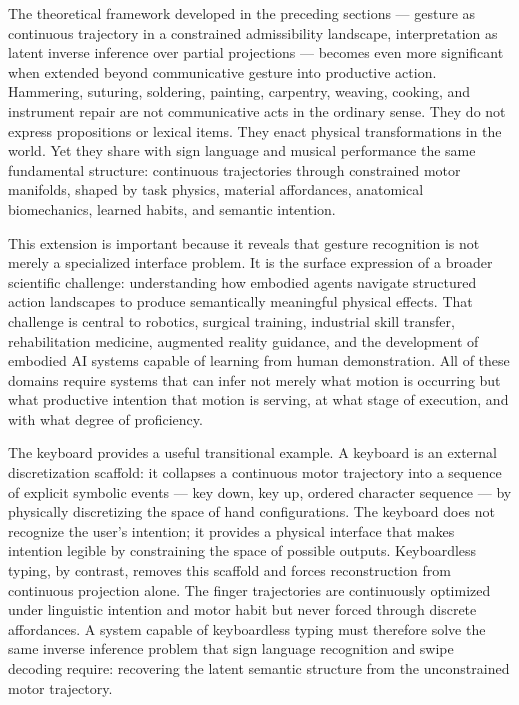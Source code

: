 \documentclass[11pt, a4paper]{article}
\theoremstyle{definition}
\begin{document}
The theoretical framework developed in the preceding sections --- gesture as continuous trajectory in a constrained admissibility landscape, interpretation as latent inverse inference over partial projections --- becomes even more significant when extended beyond communicative gesture into productive action. Hammering, suturing, soldering, painting, carpentry, weaving, cooking, and instrument repair are not communicative acts in the ordinary sense. They do not express propositions or lexical items. They enact physical transformations in the world. Yet they share with sign language and musical performance the same fundamental structure: continuous trajectories through constrained motor manifolds, shaped by task physics, material affordances, anatomical biomechanics, learned habits, and semantic intention.

This extension is important because it reveals that gesture recognition is not merely a specialized interface problem. It is the surface expression of a broader scientific challenge: understanding how embodied agents navigate structured action landscapes to produce semantically meaningful physical effects. That challenge is central to robotics, surgical training, industrial skill transfer, rehabilitation medicine, augmented reality guidance, and the development of embodied AI systems capable of learning from human demonstration. All of these domains require systems that can infer not merely what motion is occurring but what productive intention that motion is serving, at what stage of execution, and with what degree of proficiency.

The keyboard provides a useful transitional example. A keyboard is an external discretization scaffold: it collapses a continuous motor trajectory into a sequence of explicit symbolic events --- key down, key up, ordered character sequence --- by physically discretizing the space of hand configurations. The keyboard does not recognize the user's intention; it provides a physical interface that makes intention legible by constraining the space of possible outputs. Keyboardless typing, by contrast, removes this scaffold and forces reconstruction from continuous projection alone. The finger trajectories are continuously optimized under linguistic intention and motor habit but never forced through discrete affordances. A system capable of keyboardless typing must therefore solve the same inverse inference problem that sign language recognition and swipe decoding require: recovering the latent semantic structure from the unconstrained motor trajectory.
\end{document}
